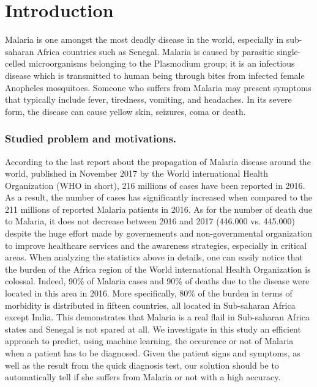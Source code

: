 \section{Introduction}\label{intro}
Malaria is one amongst the most deadly disease in the world, especially in sub-saharan Africa countries such as Senegal.
Malaria is caused by parasitic single-celled microorganisms belonging to the Plasmodium group; it is an infectious
disease which is transmitted to human being through bites from infected female Anopheles mosquitoes. Someone who suffers
from  Malaria may present symptoms that typically include fever, tiredness, vomiting, and headaches. In its severe form,
the disease can cause yellow skin, seizures, coma or death.

\subsubsection{Studied problem and motivations.}
According to the last report \cite{Wh17}  about the propagation of Malaria disease around the world, published in November 2017 by the World international Health Organization (WHO in short),
 216 millions of cases have been reported in 2016. As a result, the number of cases has significantly increased when compared to the 211 millions of reported Malaria patients in 2016.
As for the number of death due to Malaria, it does not decrease between 2016 and 2017 (446.000 vs. 445.000) despite the huge effort made by governements
and non-governmental organization to improve healthcare services and the awareness strategies, especially in critical areas. 
When analyzing the statistics above in details, one can easily notice that the burden of the Africa region of the World 
international Health Organization is colossal. Indeed, 90\% of Malaria cases and 90\% of deaths due to the disease were located in this area in 2016.
More specifically, 80\% of the burden in terms of morbidity is distributed in fifteen countries, all located in Sub-saharan Africa except India. This demonstrates
that Malaria is a real flail in Sub-saharan Africa states and Senegal is not spared at all. We investigate in this study an efficient approach to predict, using machine learning, the occurence 
or not of Malaria when a patient has to be diagnosed. Given the patient signs and symptoms, as well as the result from the quick diagnosis test, our solution should be to 
automatically tell if she suffers from Malaria or not with a high accuracy.

